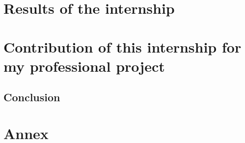 \documentclass[a4paper, 11pt, oneside, oldfontcommands]{memoir}
\newcounter{th}[chapter]
\begin{document}




\part{Results of the internship}






% 


\part{Contribution of this internship for my professional project}



\chapter*{Conclusion}
\newpage

\part*{Annex}
\appendix



% 

\nocite{*}
%
\newpage
~\\
\newpage
 \listoffigures
 \printindex
 
  
\end{document}
